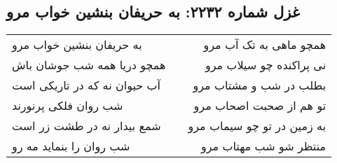 \begin{center}
\section*{غزل شماره ۲۲۳۲: به حریفان بنشین خواب مرو}
\label{sec:2232}
\begin{longtable}{l p{0.5cm} r}
به حریفان بنشین خواب مرو
&&
همچو ماهی به تک آب مرو
\\
همچو دریا همه شب جوشان باش
&&
نی پراکنده چو سیلاب مرو
\\
آب حیوان نه که در تاریکی است
&&
بطلب در شب و مشتاب مرو
\\
شب روان فلکی پرنورند
&&
تو هم از صحبت اصحاب مرو
\\
شمع بیدار نه در طشت زر است
&&
به زمین در تو چو سیماب مرو
\\
شب روان را بنماید مه رو
&&
منتظر شو شب مهتاب مرو
\\
\end{longtable}
\end{center}
